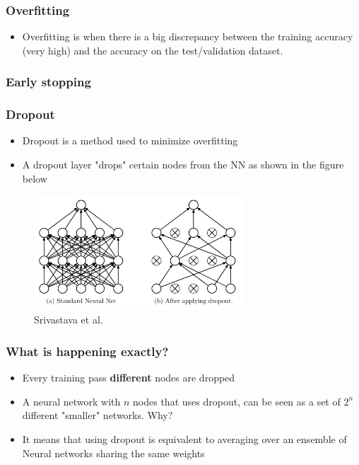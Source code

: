 \documentclass{beamer}
\begin{document}
\begin{frame}
    \frametitle{Overfitting}
    \begin{itemize}
        \item Overfitting is when there is a big discrepancy  between the training accuracy (very high) and the accuracy on the test/validation dataset.  
    \end{itemize}
    

\end{frame}
\begin{frame}
    \frametitle{Early stopping }

    

\end{frame}
\begin{frame}
    \frametitle{Dropout}
    \begin{itemize}
        \item Dropout is a method used to minimize overfitting 
        \item A dropout layer "drops" certain nodes from the NN as shown in the figure below
    \end{itemize}
    \begin{center}
        \begin{figure}
         \includegraphics[width=0.7\textwidth]{figs/dropout.png}
            \caption{Srivastava et al.}
        \end{figure}
    \end{center}
    
\end{frame}
\begin{frame}
    \frametitle{What is happening exactly?}
    \begin{itemize}
        \item Every training pass \textbf{different} nodes are dropped 
        \item A neural network with $n$ nodes that uses dropout, can be seen as a set of $2^n$ different "smaller" networks. Why?
        \item It means that using dropout is equivalent to averaging over an ensemble of Neural networks sharing the same weights
    \end{itemize}

\end{frame}
\end{document}
